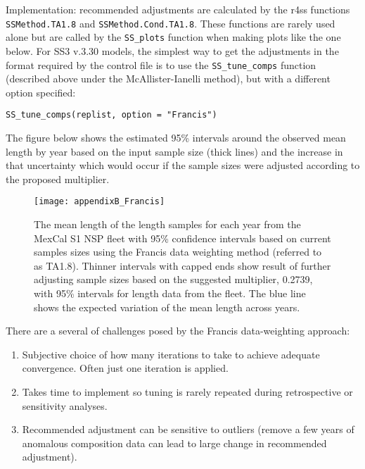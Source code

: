 Implementation: recommended adjustments are calculated by the r4ss functions \texttt{SSMethod.TA1.8} and \texttt{SSMethod.Cond.TA1.8}. These functions are rarely used alone but are called by the \texttt{SS\_plots} function when making plots like the one below. For SS3 v.3.30 models, the simplest way to get the adjustments in the format required by the control file is to use the \texttt{SS\_tune\_comps} function (described above under the McAllister-Ianelli method), but with a different option specified: 

\texttt{SS\_tune\_comps(replist, option = "Francis")}

The figure below shows the estimated 95\% intervals around the observed mean length by year based on the input sample size (thick lines) and the increase in that uncertainty which would occur if the sample sizes were adjusted according to the proposed multiplier.

\begin{figure}[h]
	\begin{center}
		\texttt{[image: appendixB\_Francis]}\\
	\end{center}
	\caption{The mean length of the length samples for each year from the MexCal S1 NSP fleet with 95\% confidence intervals based on current samples sizes using the Francis data weighting method (referred to as TA1.8). Thinner intervals with capped ends show result of further adjusting sample sizes based on the suggested multiplier, 0.2739, with 95\% intervals for length data from the fleet. The blue line shows the expected variation of the mean length across years.}
	\label{fig:francis}
\end{figure}



There are a several of challenges posed by the Francis data-weighting approach:
\begin{enumerate}
	\item Subjective choice of how many iterations to take to achieve adequate convergence. Often just one iteration is applied.
	
	\item Takes time to implement so tuning is rarely repeated during retrospective or sensitivity analyses.
	
	\item Recommended adjustment can be sensitive to outliers (remove a few years of anomalous composition data can lead to large change in recommended adjustment).
\end{enumerate}

